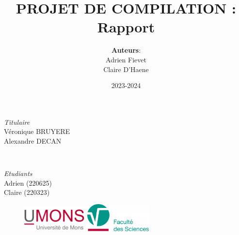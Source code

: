 \documentclass{article}
\title{PROJET DE COMPILATION :\\ Rapport}
\author{\textbf{Auteurs}: \\ Adrien Fievet \\ Claire D'Haene}
\date{2023-2024}
\begin{document}
\maketitle

\vspace{7\baselineskip}

\begin{minipage}{0.4\textwidth}
    \begin{flushleft}
        \large
        \textit{Titulaire}\\
        Véronique \textsc{BRUYERE}\\
        Alexandre \textsc{DECAN}
    \end{flushleft}
\end{minipage}
~
\begin{minipage}{0.5\textwidth}
    \begin{flushright}
        \large
        \textit{Etudiants}\\
        Adrien (220625)\\
        Claire (220323)\\
    \end{flushright}
\end{minipage}

\begin{figure}
    \centering
    \includegraphics[width = 0.3\textwidth]{images/umons.jpeg}
    \hspace{5em}
    \includegraphics[width = 0.3\textwidth]{images/facSciences.png}
\end{figure}

\thispagestyle{empty}

\newpage
\tableofcontents
\newpage




\end{document}
